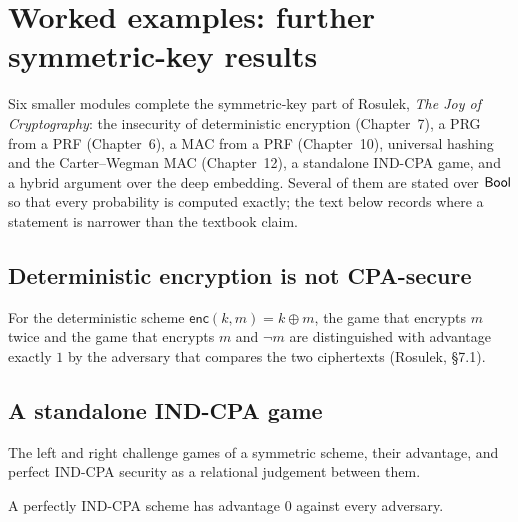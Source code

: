 \chapter{Worked examples: further symmetric-key results}

Six smaller modules complete the symmetric-key part of Rosulek, \emph{The Joy of
Cryptography}: the insecurity of deterministic encryption (Chapter~7), a PRG from
a PRF (Chapter~6), a MAC from a PRF (Chapter~10), universal hashing and the
Carter--Wegman MAC (Chapter~12), a standalone IND-CPA game, and a hybrid argument
over the deep embedding. Several of them are stated over $\mathsf{Bool}$ so that every
probability is computed exactly; the text below records where a statement is
narrower than the textbook claim.

\section{Deterministic encryption is not CPA-secure}

\begin{theorem}
  \label{thm:detcpa-insecure}
  \leanok
  For the deterministic scheme $\mathsf{enc}(k, m) = k \oplus m$, the game that
  encrypts $m$ twice and the game that encrypts $m$ and $\lnot m$ are
  distinguished with advantage exactly $1$ by the adversary that compares the two
  ciphertexts (Rosulek, §7.1).
\end{theorem}

\section{A standalone IND-CPA game}

\begin{definition}
  \label{def:indcpa-standalone}
  \leanok
  The left and right challenge games of a symmetric scheme, their advantage, and
  perfect IND-CPA security as a relational judgement between them.
\end{definition}

\begin{theorem}
  \label{thm:indcpa-standalone-zero}
  \leanok
  A perfectly IND-CPA scheme has advantage $0$ against every adversary.
\end{theorem}

